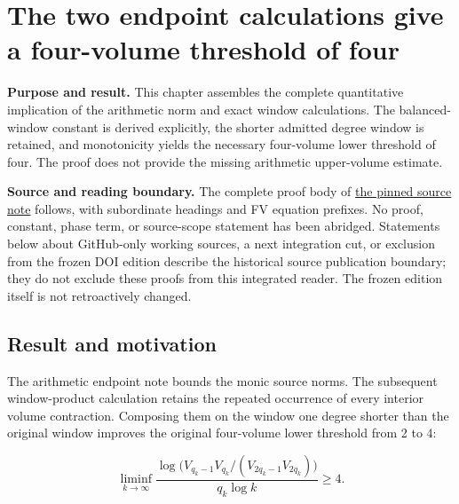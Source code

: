 \section{The two endpoint calculations give a four-volume threshold of four}\label{four-volume-the-two-endpoint-calculations-give-a-four-volume-threshold-of-four}

\textbf{Purpose and result.}
This chapter assembles the complete quantitative implication of the arithmetic norm and exact window calculations. The balanced-window constant is derived explicitly, the shorter admitted degree window is retained, and monotonicity yields the necessary four-volume lower threshold of four. The proof does not provide the missing arithmetic upper-volume estimate.

\textbf{Source and reading boundary.}
The complete proof body of \href{https://github.com/KokunoYumeto/zeta-function-research-reader/blob/952ef9fee1e1419b6858d920354de8fa99430b7d/workbenches/tau-arithmetic-endpoint-bounds/FOUR_VOLUME_THRESHOLD.md}{the pinned source note} follows, with subordinate headings and FV equation prefixes. No proof, constant, phase term, or source-scope statement has been abridged. Statements below about GitHub-only working sources, a next integration cut, or exclusion from the frozen DOI edition describe the historical source publication boundary; they do not exclude these proofs from this integrated reader. The frozen edition itself is not retroactively changed.

\begingroup
\setlength{\emergencystretch}{3em}
\providecommand{\tightlist}{\setlength{\itemsep}{0pt}\setlength{\parskip}{0pt}}

\subsection[\hspace{0.4em}Result and motivation]{Result and motivation}\label{four-volume-result-and-motivation}

The arithmetic endpoint note bounds the monic source norms. The subsequent window-product calculation retains the repeated occurrence of every interior volume contraction. Composing them on the window one degree shorter than the original window improves the original four-volume lower threshold from 2 to 4:

\[
\boxed{\liminf_{k\to\infty}
\frac{\log\bigl(V_{q_k-1}V_{q_k}/(V_{2q_k-1}V_{2q_k})\bigr)}
{q_k\log k}\ge4.}
\]

